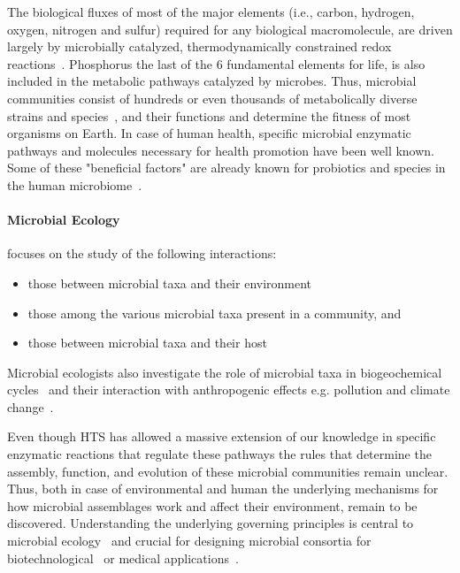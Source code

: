       The biological fluxes of most of the major elements (i.e., carbon, hydrogen, oxygen, nitrogen and sulfur) required
      for any biological macromolecule,
      are driven largely
      by microbially catalyzed, thermodynamically constrained redox reactions~\cite{falkowski2008microbial}. 
      Phosphorus the last of the 6 fundamental elements for life, is also included in the metabolic pathways catalyzed by microbes. 
      Thus, microbial communities consist of hundreds or even thousands of metabolically diverse strains and species~\cite{leventhal2018strain},
      and their functions
      and determine the fitness of most organisms on Earth. 
      In case of human health, specific microbial enzymatic pathways and molecules necessary for health promotion have been well known.
      Some of these "beneficial factors" are already known for probiotics and species in the human microbiome~\cite{marco2021defining}.


      \paragraph{Microbial Ecology} focuses on the study of the following interactions: 
      \begin{itemize}
         \setlength\itemsep{0.05em}
         \item those between microbial taxa and their environment
         \item those among the various microbial taxa present in a community, and
         \item those between microbial taxa and their host~\cite{isme}
      \end{itemize}

      Microbial ecologists also investigate the role of microbial taxa in 
      biogeochemical cycles~\cite{falkowski2008microbial} and their interaction 
      with anthropogenic effects e.g. pollution and climate change~\cite{cavicchioli2019scientists}.

      Even though HTS has allowed a massive extension of our knowledge in  
      specific enzymatic reactions that regulate these pathways the rules that determine 
      the assembly, function, and evolution of these microbial communities remain unclear. 
      Thus, both in case of environmental and human
      the underlying mechanisms for how microbial assemblages work and affect their environment, remain to be discovered.
      Understanding the underlying governing principles is central to microbial ecology~\cite{giri2021metabolic} and crucial for designing microbial consortia for biotechnological~\cite{giri2020harnessing} or medical applications~\cite{kong2018designing}.

